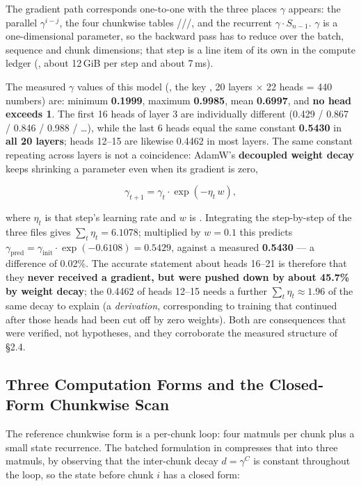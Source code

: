 The gradient path corresponds one-to-one with the three places $\gamma$ appears: the parallel
$\gamma^{i-j}$, the four chunkwise tables
///, and the recurrent
$\gamma\cdot S_{n-1}$. $\gamma$ is a one-dimensional parameter, so the backward pass has to reduce
over the batch, sequence and chunk dimensions; that step is a line item of its own in the compute
ledger (, about 12\,GiB per step and about 7\,ms).

The measured $\gamma$ values of this model
(, the key ,
20 layers $\times$ 22 heads = 440 numbers) are: minimum \textbf{0.1999}, maximum \textbf{0.9985},
mean \textbf{0.6997}, and \textbf{no head exceeds 1}. The first 16 heads of layer 3 are
individually different (0.429 / 0.867 / 0.846 / 0.988 / \dots), while the last 6 heads equal the
same constant \textbf{0.5430} in \textbf{all 20 layers}; heads 12--15 are likewise 0.4462 in most
layers. The same constant repeating across layers is not a coincidence: AdamW's \textbf{decoupled
weight decay} keeps shrinking a parameter even when its gradient is zero,

\[
\gamma_{t+1}=\gamma_t\cdot\exp(-\eta_t\,w),
\]

where $\eta_t$ is that step's learning rate and $w$ is . Integrating the
step-by-step  of the three  files gives
$\sum_t\eta_t=6.1078$; multiplied by $w=0.1$ this predicts
$\gamma_{\text{pred}}=\gamma_{\text{init}}\cdot\exp(-0.6108)=0.5429$, against a measured
\textbf{0.5430} --- a difference of 0.02\%. The accurate statement about heads 16--21 is therefore
that they \textbf{never received a gradient, but were pushed down by about 45.7\% by weight
decay}; the 0.4462 of heads 12--15 needs a further $\sum_t\eta_t\approx1.96$ of the same decay to
explain (a \emph{derivation}, corresponding to training that continued after those heads had been
cut off by zero weights). Both are consequences that were verified, not hypotheses, and they
corroborate the measured structure of \S2.4.

\subsection{Three Computation Forms and the Closed-Form Chunkwise Scan}

The reference chunkwise form is a per-chunk loop: four matmuls per chunk plus a small state
recurrence. The batched formulation in  compresses that into
three matmuls, by observing that the inter-chunk decay $d=\gamma^{C}$ is constant throughout the
loop, so the state before chunk $i$ has a closed form:

